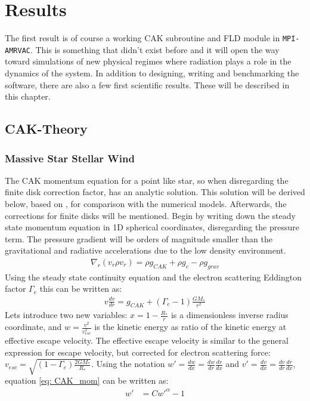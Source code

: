 \chapter{Results}
The first result is of course a working CAK subroutine and FLD module in \texttt{MPI-AMRVAC}. This is something that didn't exist before and it will open the way toward simulations of new physical regimes where radiation plays a role in the dynamics of the system. In addition to   designing, writing and benchmarking the software, there are also a few first scientific results. These will be described in this chapter.

\section{CAK-Theory}
\subsection{Massive Star Stellar Wind}
The CAK momentum equation for a point like star, so when disregarding the finite disk correction factor, has an analytic solution. This solution will be derived below, based on \citep{Owocki2003}, for comparison with the numerical models. Afterwards, the corrections for finite disks will be mentioned. Begin by writing down the steady state momentum equation in 1D spherical coordinates, disregarding the pressure term. The pressure gradient will be orders of magnitude smaller than the gravitational and radiative accelerations due to the low density environment. 
\begin{align}
\nabla_r \left(v_r \rho v_r \right) = \rho g_{CAK} + \rho g_{e} - \rho g_{grav}
\end{align}
Using the steady state continuity equation and the electron scattering Eddington factor $\Gamma_e$ this can be written as:
\begin{align}
v \frac{d v}{d r} = g_{CAK} + (\Gamma_e-1) \frac{G M_*}{r^2} \label{eq: CAK_mom}
\end{align}
Lets introduce two new variables: $x = 1- \frac{R_*}{r}$ is a dimensionless inverse radius coordinate, and $w = \frac{v^2}{v_{esc}^2}$ is the kinetic energy as ratio of the kinetic energy at effective escape velocity. The effective escape velocity is similar to the general expression for escape velocity, but corrected for electron scattering force: $v_{esc} = \sqrt{(1- \Gamma_e) \frac{2 G M_* }{R_*}}$. Using the notation $w' = \frac{dw}{dx} = \frac{dw}{dr}\frac{dr}{dx}$ and $v' = \frac{dv}{dx} = \frac{dv}{dr} \frac{dr}{dx}$, equation \eqref{eq: CAK_mom} can be written as:
\begin{align}
w' &= C w'^\alpha - 1 \label{eq: CAK_w}
\end{align}


